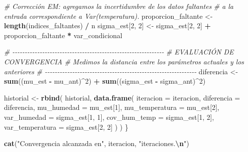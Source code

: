 \documentclass[
]{article}
\newenvironment{Shaded}{\begin{snugshade}}{\end{snugshade}}
\newcommand{\AttributeTok}[1]{\textcolor[rgb]{0.13,0.29,0.53}{#1}}
\newcommand{\CommentTok}[1]{\textcolor[rgb]{0.56,0.35,0.01}{\textit{#1}}}
\newcommand{\DecValTok}[1]{\textcolor[rgb]{0.00,0.00,0.81}{#1}}
\newcommand{\FunctionTok}[1]{\textcolor[rgb]{0.13,0.29,0.53}{\textbf{#1}}}
\newcommand{\NormalTok}[1]{#1}
\newcommand{\OtherTok}[1]{\textcolor[rgb]{0.56,0.35,0.01}{#1}}
\newcommand{\SpecialCharTok}[1]{\textcolor[rgb]{0.81,0.36,0.00}{\textbf{#1}}}
\newcommand{\StringTok}[1]{\textcolor[rgb]{0.31,0.60,0.02}{#1}}
\begin{document}
\begin{Shaded}
\begin{Highlighting}[]
  \CommentTok{\# Corrección EM: agregamos la incertidumbre de los datos faltantes}
  \CommentTok{\# a la entrada correspondiente a Var(temperatura).}
\NormalTok{  proporcion\_faltante }\OtherTok{\textless{}{-}} \FunctionTok{length}\NormalTok{(indices\_faltantes) }\SpecialCharTok{/}\NormalTok{ n}
\NormalTok{  sigma\_est[}\DecValTok{2}\NormalTok{, }\DecValTok{2}\NormalTok{] }\OtherTok{\textless{}{-}}\NormalTok{ sigma\_est[}\DecValTok{2}\NormalTok{, }\DecValTok{2}\NormalTok{] }\SpecialCharTok{+}\NormalTok{ proporcion\_faltante }\SpecialCharTok{*}\NormalTok{ var\_condicional}
  
  \CommentTok{\# {-}{-}{-}{-}{-}{-}{-}{-}{-}{-}{-}{-}{-}{-}{-}{-}{-}{-}{-}{-}{-}{-}{-}{-}{-}{-}{-}{-}{-}{-}{-}{-}{-}{-}{-}{-}{-}{-}{-}{-}{-}{-}{-}{-}{-}{-}{-}{-}{-}{-}{-}{-}{-}{-}{-}{-}{-}{-}{-}{-}{-}}
  \CommentTok{\# EVALUACIÓN DE CONVERGENCIA}
  \CommentTok{\# Medimos la distancia entre los parámetros actuales y los anteriores}
  \CommentTok{\# {-}{-}{-}{-}{-}{-}{-}{-}{-}{-}{-}{-}{-}{-}{-}{-}{-}{-}{-}{-}{-}{-}{-}{-}{-}{-}{-}{-}{-}{-}{-}{-}{-}{-}{-}{-}{-}{-}{-}{-}{-}{-}{-}{-}{-}{-}{-}{-}{-}{-}{-}{-}{-}{-}{-}{-}{-}{-}{-}{-}{-}}
\NormalTok{  diferencia }\OtherTok{\textless{}{-}} \FunctionTok{sum}\NormalTok{((mu\_est }\SpecialCharTok{{-}}\NormalTok{ mu\_ant)}\SpecialCharTok{\^{}}\DecValTok{2}\NormalTok{) }\SpecialCharTok{+} \FunctionTok{sum}\NormalTok{((sigma\_est }\SpecialCharTok{{-}}\NormalTok{ sigma\_ant)}\SpecialCharTok{\^{}}\DecValTok{2}\NormalTok{)}
  
\NormalTok{  historial }\OtherTok{\textless{}{-}} \FunctionTok{rbind}\NormalTok{(}
\NormalTok{    historial,}
    \FunctionTok{data.frame}\NormalTok{(}
      \AttributeTok{iteracion =}\NormalTok{ iteracion,}
      \AttributeTok{diferencia =}\NormalTok{ diferencia,}
      \AttributeTok{mu\_humedad =}\NormalTok{ mu\_est[}\DecValTok{1}\NormalTok{],}
      \AttributeTok{mu\_temperatura =}\NormalTok{ mu\_est[}\DecValTok{2}\NormalTok{],}
      \AttributeTok{var\_humedad =}\NormalTok{ sigma\_est[}\DecValTok{1}\NormalTok{, }\DecValTok{1}\NormalTok{],}
      \AttributeTok{cov\_hum\_temp =}\NormalTok{ sigma\_est[}\DecValTok{1}\NormalTok{, }\DecValTok{2}\NormalTok{],}
      \AttributeTok{var\_temperatura =}\NormalTok{ sigma\_est[}\DecValTok{2}\NormalTok{, }\DecValTok{2}\NormalTok{]}
\NormalTok{    )}
\NormalTok{  )}
\NormalTok{\}}
\end{Highlighting}
\end{Shaded}

\begin{Shaded}
\begin{Highlighting}[]
\FunctionTok{cat}\NormalTok{(}\StringTok{"Convergencia alcanzada en"}\NormalTok{, iteracion, }\StringTok{"iteraciones.}\SpecialCharTok{\textbackslash{}n}\StringTok{"}\NormalTok{)}
\end{Highlighting}
\end{Shaded}
\end{document}
